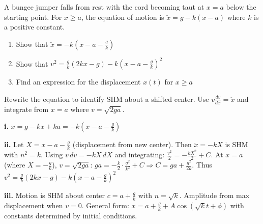 
\begin{problem}
A bungee jumper falls from rest with the cord becoming taut at $x = a$ below the starting point. For $x \ge a$, the equation of motion is $\ddot{x} = g - k(x-a)$ where $k$ is a positive constant.

\begin{enumerate}[label=\textbf{\roman*.}]
    \item Show that $\ddot{x} = -k\left(x - a - \frac{g}{k}\right)$
    \item Show that $v^2 = \frac{g}{k}(2kx - g) - k\left(x - a - \frac{g}{k}\right)^2$
    \item Find an expression for the displacement $x(t)$ for $x \ge a$
\end{enumerate}
\end{problem}

\begin{hint}
Rewrite the equation to identify SHM about a shifted center. Use $v\frac{dv}{dx} = \ddot{x}$ and integrate from $x = a$ where $v = \sqrt{2ga}$.
\end{hint}

\begin{solution}
\textbf{i.} $\ddot{x} = g - kx + ka = -k\left(x - a - \frac{g}{k}\right)$ 

\textbf{ii.} Let $X = x - a - \frac{g}{k}$ (displacement from new center). Then $\ddot{x} = -kX$ is SHM with $n^2 = k$. Using $v\,dv = -kX\,dX$ and integrating: $\frac{v^2}{2} = -\frac{kX^2}{2} + C$. At $x = a$ (where $X = -\frac{g}{k}$), $v = \sqrt{2ga}$: $ga = -\frac{k}{2} \cdot \frac{g^2}{k^2} + C \Rightarrow C = ga + \frac{g^2}{2k}$. Thus $v^2 = \frac{g}{k}(2kx-g) - k\left(x-a-\frac{g}{k}\right)^2$ 

\textbf{iii.} Motion is SHM about center $c = a + \frac{g}{k}$ with $n = \sqrt{k}$. Amplitude from max displacement when $v=0$. General form: $x = a + \frac{g}{k} + A\cos(\sqrt{k}t + \phi)$ with constants determined by initial conditions.
\end{solution}

